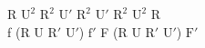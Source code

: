 R $\text{U}^2$ $\text{R}^2$ $\text{U}'$ $\text{R}^2$ $\text{U}'$ $\text{R}^2$ $\text{U}^2$ R\\
f (R U $\text{R}'$ $\text{U}'$) $\text{f}'$ F (R U $\text{R}'$ $\text{U}'$) $\text{F}'$\\
